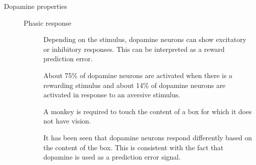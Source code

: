 \begin{description}
    \item[Dopamine properties]
        \phantom{}

        \begin{description}
            \item[Phasic response] 
                Depending on the stimulus, dopamine neurons can show excitatory or inhibitory responses.
                This can be interpreted as a reward prediction error.

                \begin{remark}
                    About 75\% of dopamine neurons are activated when there is a rewarding stimulus
                    and about 14\% of dopamine neurons are activated in response to an aversive stimulus.
                \end{remark}

                \begin{casestudy}
                    A monkey is required to touch the content of a box for which it does not have vision.

                    It has been seen that dopamine neurons respond differently based on the content of the box.
                    This is consistent with the fact that dopamine is used as a prediction error signal.
                

\end{casestudy}
\end{description}
\end{description}
